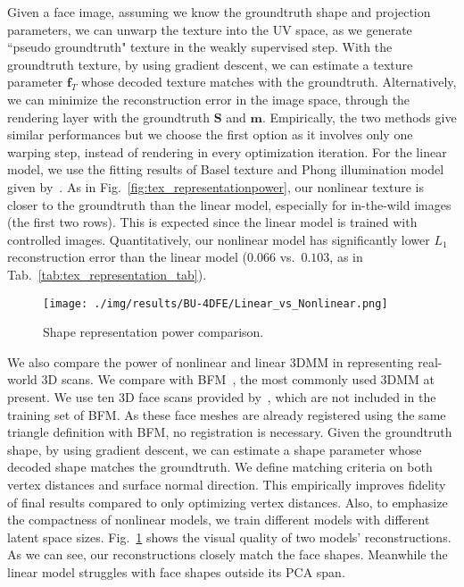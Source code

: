 Given a face image, assuming we know the groundtruth shape and projection parameters, we can unwarp the texture into the UV space, as we generate ``pseudo groundtruth" texture in the weakly supervised step. 
With the groundtruth texture, by using gradient descent, we can estimate a texture parameter  $\mathbf{f}_T$ whose decoded texture matches with the groundtruth. 
Alternatively, we can minimize the reconstruction error in the image space, through the rendering layer with the groundtruth $\mathbf{S}$ and $\mathbf{m}$. 
Empirically, the two methods give similar performances but we choose the first option as it involves only one warping step, instead of rendering in every optimization iteration.
For the linear model, we use the fitting results of Basel texture and Phong illumination model~\cite{phong1975illumination} given by~\cite{zhu2016face}. 
As in Fig.~\ref{fig:tex_representationpower}, our nonlinear texture is closer to the groundtruth than the linear model, especially for in-the-wild images (the first two rows).
This is expected since the linear model is trained with controlled images. 
Quantitatively, our nonlinear model has significantly lower $L_1$ reconstruction error than the linear model ($0.066$ vs.~$0.103$, as in Tab.~\ref{tab:tex_representation_tab}).


\begin{figure}[t!]
\begin{center}
\small
\texttt{[image: ./img/results/BU-4DFE/Linear\_vs\_Nonlinear.png]}
\figvspace\vspace{1mm}
\caption{\small Shape representation power comparison.}
\label{fig:shape_representation}\figvspace
\end{center}
\end{figure}



We also compare the power of nonlinear and linear 3DMM in representing real-world 3D scans. 
We compare with BFM~\cite{paysan20093d}, the most commonly used 3DMM at present. 
We use ten 3D face scans provided by~\cite{paysan20093d}, which are not included in the training set of BFM.
As these face meshes are already registered using the same triangle definition with BFM,  no registration is necessary.
Given the groundtruth shape, by using gradient descent, we can estimate a shape parameter whose decoded shape matches the groundtruth. 
We define matching criteria on both vertex distances and surface normal direction. 
This empirically improves fidelity of final results compared to only optimizing vertex distances.
Also, to emphasize the compactness of nonlinear models, we train different models with different latent space sizes.
Fig.~\ref{fig:shape_representation} shows the visual quality of two models' reconstructions.
As we can see, our reconstructions closely match the face shapes. 
Meanwhile the linear model struggles with face shapes outside its PCA span.

